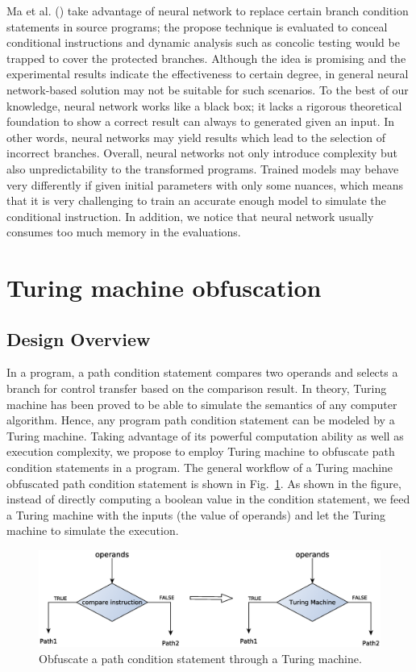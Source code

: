 \documentclass[lnicst]{svmultln}
\newcommand{\F}{Fig.}
\begin{document}
Ma et al. (\cite{Ma, Maieee}) take advantage of neural network to replace
certain branch condition statements in source programs; the propose technique is
evaluated to conceal conditional instructions and dynamic analysis such as
concolic testing would be trapped to cover the protected branches. Although the
idea is promising and the experimental results indicate the effectiveness to
certain degree, in general neural network-based solution may not be suitable for
such scenarios. To the best of our knowledge, neural network works like a black
box; it lacks a rigorous theoretical foundation to show a correct result can
always to generated given an input. In other words, neural networks may yield
results which lead to the selection of incorrect branches. Overall, neural
networks not only introduce complexity but also unpredictability to the
transformed programs. Trained models may behave very differently if given
initial parameters with only some nuances, which means that it is very
challenging to train an accurate enough model to simulate the conditional
instruction. In addition, we notice that neural network usually consumes too
much memory in the evaluations.

%
\section{Turing machine obfuscation}
%
\subsection{Design Overview}
In a program, a path condition statement compares two operands and selects a
branch for control transfer based on the comparison result. In theory, Turing
machine has been proved to be able to simulate the semantics of any computer
algorithm. Hence, any program path condition statement can be modeled by a
Turing machine. Taking advantage of its powerful computation ability as well as
execution complexity, we propose to employ Turing machine to obfuscate path
condition statements in a program. The general workflow of a Turing machine
obfuscated path condition statement is shown in \F~\ref{fig:two}. As shown in
the figure, instead of directly computing a boolean value in the condition
statement, we feed a Turing machine with the inputs (the value of operands) and
let the Turing machine to simulate the execution.

\begin{figure}
 \includegraphics[width=\linewidth]{figure2.eps}
 \caption{Obfuscate a path condition statement through a Turing machine.}
 \label{fig:two}
\end{figure}
\end{document}

